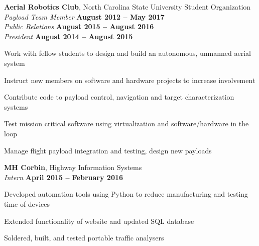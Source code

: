 \documentclass[margin,line]{resume}
\begin{document}
\begin{resume}
\begin{list2}
    \end{list2}
    \vspace{3mm}




    \textbf{Aerial Robotics Club}, North Carolina State University Student Organization\\
    \textsl{Payload Team Member} \hfill \textbf{August 2012 -- May 2017}\\
    \textsl{Public Relations} \hfill \textbf{August 2015 -- August 2016}\\
    \textsl{President} \hfill \textbf{August 2014 -- August 2015}\\
    \vspace{-3mm}
    \begin{list2}
    \item Work with fellow students to design and build an autonomous, unmanned aerial system
    \item Instruct new members on software and hardware projects to increase involvement
    \item Contribute code to payload control, navigation and target characterization systems
    \item Test mission critical software using virtualization and software/hardware in the loop
	\item Manage flight payload integration and testing, design new payloads
    \end{list2}
    \vspace{3mm}




    \textbf{MH Corbin}, Highway Information Systems\\
    \textsl{Intern}  \hfill \textbf{April 2015 -- February 2016} \\
    \vspace{-4mm}
    \begin{list2}
    \item Developed automation tools using Python to reduce manufacturing and testing time of devices
    \item Extended functionality of website and updated SQL database
    \item Soldered, built, and tested portable traffic analysers
    \end{list2}
    \vspace{3mm}




\end{resume}
\end{document}
